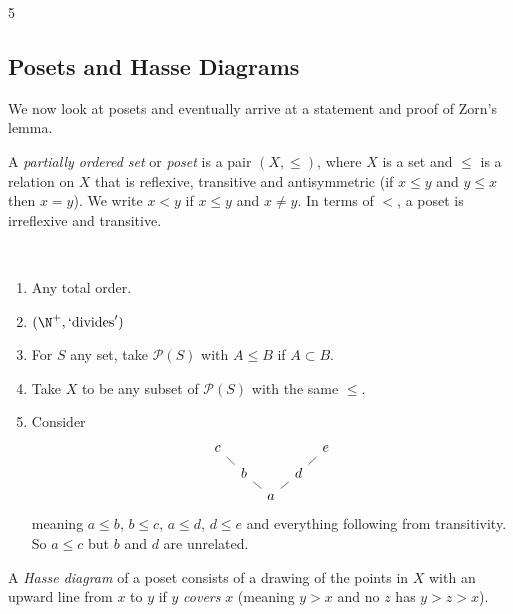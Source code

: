 \documentclass[a3paper, 10pt]{article}
\newcommand{\enumpre}{}
\renewcommand{\vocab}[1]{\emph{#1}}
\begin{document}
\begin{multicols*}{5}
\subsection{Posets and Hasse Diagrams}

We now look at posets and eventually arrive at a statement and proof of Zorn's lemma.

\begin{definition}[Poset]
  A \vocab{partially ordered set} or \vocab{poset} is a pair $(X, \leq)$, where $X$ is a set and $\leq$ is a relation on $X$ that is reflexive, transitive and antisymmetric (if $x \leq y$ and $y \leq x$ then $x = y$). We write $x < y$ if $x \leq y$ and $x \neq y$. In terms of $<$, a poset is irreflexive and transitive.
\end{definition}

\begin{example}~
  \enumpre
  \begin{enumerate}
    \item Any total order.
    \item $(\N^+, `\text{divides}')$
    \item For $S$ any set, take $\mathcal{P}(S)$ with $A \leq B$ if $A \subset B$.
    \item Take $X$ to be any subset of $\mathcal{P}(S)$ with the same $\leq$.
    \item Consider
\[\begin{tikzcd}[sep=tiny]
	c &&&& e \\
	& b && d \\
	&& a
	\arrow[no head, from=3-3, to=2-2]
	\arrow[no head, from=2-2, to=1-1]
	\arrow[no head, from=3-3, to=2-4]
	\arrow[no head, from=2-4, to=1-5]
\end{tikzcd}\]
meaning $a \leq b$, $b \leq c$, $a \leq d$, $d \leq e$ and everything following from transitivity. So $a \leq c$ but $b$ and $d$ are unrelated.
  \end{enumerate}
\end{example}

\begin{definition}
  A \vocab{Hasse diagram} of a poset consists of a drawing of the points in $X$ with an upward line from $x$ to $y$ if $y$ \vocab{covers} $x$ (meaning $y > x$ and no $z$ has $y > z > x$).
\end{definition}


\end{multicols*}
\end{document}
